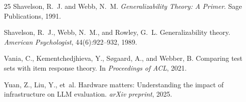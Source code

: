 \documentclass[11pt]{article}
\begin{document}
\begin{thebibliography}{25}
Shavelson, R.~J. and Webb, N.~M.
\newblock \emph{Generalizability Theory: A Primer}.
\newblock Sage Publications, 1991.

Shavelson, R.~J., Webb, N.~M., and Rowley, G.~L.
\newblock Generalizability theory.
\newblock \emph{American Psychologist}, 44(6):922--932, 1989.

Vania, C., Kementchedjhieva, Y., S{\o}gaard, A., and Webber, B.
\newblock Comparing test sets with item response theory.
\newblock In \emph{Proceedings of ACL}, 2021.

Yuan, Z., Liu, Y., et~al.
\newblock Hardware matters: Understanding the impact of infrastructure on {LLM} evaluation.
\newblock \emph{arXiv preprint}, 2025.

\end{thebibliography}
\end{document}
